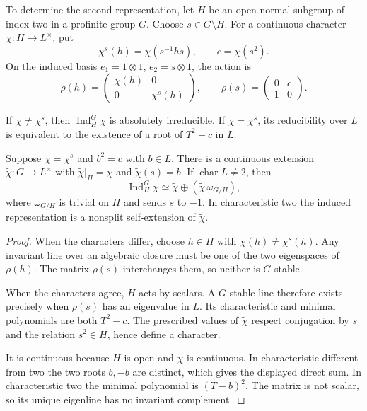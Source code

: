 To determine the second representation, let $H$ be an open normal
subgroup of index two in a profinite group $G$. Choose $s\in G\setminus H$.
For a continuous character $\chi:H\to L^\times$, put
\[
 \chi^s(h)=\chi(s^{-1}hs),\qquad c=\chi(s^2).
\]
On the induced basis $e_1=1\otimes1$, $e_2=s\otimes1$, the action is
\begin{equation}
\label{v4-arith:ic:quadratic-local:matrices}
 \rho(h)=\begin{pmatrix}\chi(h)&0\\0&\chi^s(h)\end{pmatrix},
 \qquad
 \rho(s)=\begin{pmatrix}0&c\\1&0\end{pmatrix}.
\end{equation}

\begin{proposition}
\label{v4-arith:ic:quadratic-local:criterion}
If $\chi\ne\chi^s$, then $\operatorname{Ind}_H^G\chi$ is absolutely
irreducible. If $\chi=\chi^s$, its reducibility over $L$ is equivalent
to the existence of a root of $T^2-c$ in $L$.

Suppose $\chi=\chi^s$ and $b^2=c$ with $b\in L$. There is a continuous
extension $\widetilde\chi:G\to L^\times$ with
$\widetilde\chi|_H=\chi$ and $\widetilde\chi(s)=b$.
If $\operatorname{char}L\ne2$, then
\[
 \operatorname{Ind}_H^G\chi
 \simeq\widetilde\chi\oplus(\widetilde\chi\,\omega_{G/H}),
\]
where $\omega_{G/H}$ is trivial on $H$ and sends $s$ to $-1$.
In characteristic two the induced representation is a nonsplit
self-extension of $\widetilde\chi$.
\end{proposition}

\begin{proof}
When the characters differ, choose $h\in H$ with
$\chi(h)\ne\chi^s(h)$. Any invariant line over an algebraic closure
must be one of the two eigenspaces of $\rho(h)$. The matrix $\rho(s)$
interchanges them, so neither is $G$-stable.

When the characters agree, $H$ acts by scalars. A $G$-stable line
therefore exists precisely when $\rho(s)$ has an eigenvalue in $L$.
Its characteristic and minimal polynomials are both $T^2-c$.
The prescribed values of $\widetilde\chi$ respect conjugation by $s$
and the relation $s^2\in H$, hence define a character.

It is continuous because $H$ is open and $\chi$ is continuous.
In characteristic different from two the two roots $b,-b$ are distinct,
which gives the displayed direct sum. In characteristic two the
minimal polynomial is $(T-b)^2$. The matrix is not scalar, so its
unique eigenline has no invariant complement.
\end{proof}

